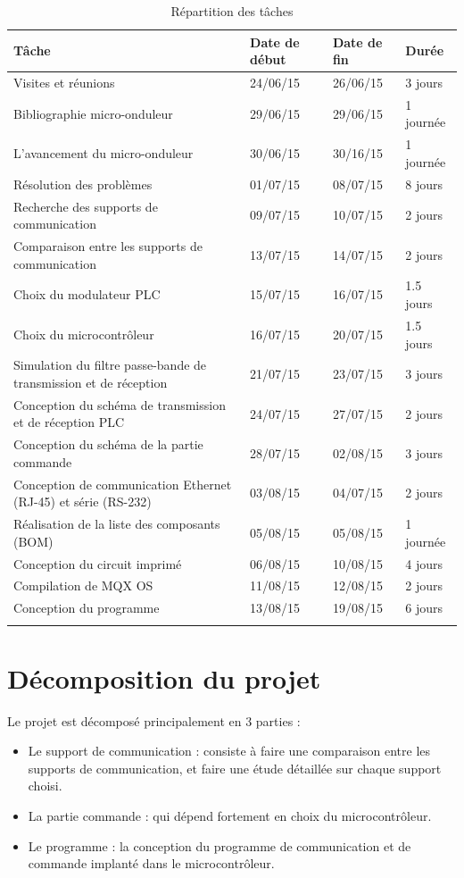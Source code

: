 \documentclass[11pt, a4paper, twoside]{book}
\begin{document}
\begin{longtable}{|p{}|p{}|p{}| p{}|}
\hline
\textbf{Tâche} & \textbf{Date de début} & \textbf{Date de fin} & \textbf{Durée} \\
\hline
Visites et réunions & 24/06/15 & 26/06/15 & 3 jours \\
\hline
Bibliographie micro-onduleur & 29/06/15 & 29/06/15 & 1 journée \\
\hline
L'avancement du micro-onduleur & 30/06/15 & 30/16/15 & 1 journée \\
\hline
Résolution des problèmes & 01/07/15 & 08/07/15 & 8 jours \\
\hline
Recherche des supports de communication & 09/07/15 & 10/07/15 & 2 jours \\
\hline
Comparaison entre les supports de communication & 13/07/15 & 14/07/15 & 2 jours \\
\hline
Choix du modulateur PLC & 15/07/15 & 16/07/15 & 1.5 jours \\
\hline
Choix du microcontrôleur & 16/07/15 & 20/07/15 & 1.5 jours \\
\hline
Simulation du filtre passe-bande de transmission et de réception & 21/07/15 & 23/07/15 & 3 jours \\
\hline
Conception du schéma de transmission et de réception PLC & 24/07/15 & 27/07/15 & 2 jours \\
\hline
Conception du schéma de la partie commande & 28/07/15 & 02/08/15 & 3 jours \\
\hline
Conception de communication Ethernet (RJ-45) et série (RS-232) & 03/08/15 & 04/07/15 & 2 jours \\
\hline
Réalisation de la liste des composants (BOM) & 05/08/15 & 05/08/15 & 1 journée \\
\hline
Conception du circuit imprimé & 06/08/15 & 10/08/15 & 4 jours \\
\hline
Compilation de MQX OS & 11/08/15 & 12/08/15 & 2 jours \\
\hline
Conception du programme & 13/08/15 & 19/08/15 & 6 jours \\
\hline
\caption{Répartition des tâches}
\end{longtable}

\section{Décomposition du projet}
Le projet est décomposé principalement en 3 parties :
\begin{itemize}
\item Le support de communication : consiste à faire une comparaison entre les supports de communication, et faire une étude détaillée sur chaque support choisi.
\item La partie commande : qui dépend fortement en choix du microcontrôleur.
\item Le programme : la conception du programme de communication et de commande implanté dans le microcontrôleur.
\end{itemize}
\end{document}
